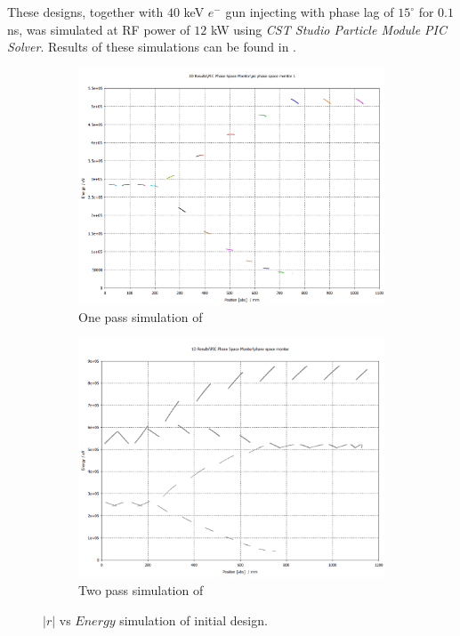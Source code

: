 \documentclass[a4paper,oneside,12pt]{report}
\numberwithin{equation}{chapter}
\begin{document}
These designs, together with $40$ keV $e^-$ gun injecting with phase lag of $15^\circ$ for $0.1$ ns, was simulated at RF power of $12$ kW using \textit{CST Studio Particle Module PIC Solver}.
Results of these simulations can be found in .

\begin{figure}[H]
    \captionsetup[subfigure]{justification=centering}
    \captionsetup{justification=centering}
    \centering
    \begin{subfigure}[b]{.8\textwidth}
      \centering
      \includegraphics[width=\linewidth]{./figures/cst/cst_first_design4.png}
      \caption{One pass simulation of }
    \end{subfigure}
    \centering
    \begin{subfigure}[b]{.8\textwidth}
      \centering
      \includegraphics[width=\linewidth]{./figures/cst/cst_second_design3.png}
      \caption{Two pass simulation of }
    \end{subfigure}
    \caption{$|r|$ vs $Energy$ simulation of initial design.}
    \label{fig:initial_designs_PIC_phase_space_monitor}
\end{figure}
\end{document}

